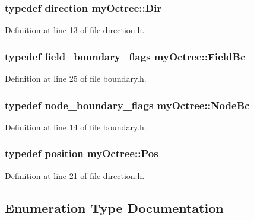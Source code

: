 \subsubsection[{Dir}]{\setlength{\rightskip}{0pt plus 5cm}typedef {\bf direction} {\bf my\+Octree\+::\+Dir}}\label{namespacemy_octree_a4895f593ecb4b9b86353c728c62fff97}


Definition at line 13 of file direction.\+h.

\hypertarget{namespacemy_octree_a7fe9f44df74345b4ab428b88ed3bba4e}{}
\subsubsection[{Field\+Bc}]{\setlength{\rightskip}{0pt plus 5cm}typedef {\bf field\+\_\+boundary\+\_\+flags} {\bf my\+Octree\+::\+Field\+Bc}}\label{namespacemy_octree_a7fe9f44df74345b4ab428b88ed3bba4e}


Definition at line 25 of file boundary.\+h.

\hypertarget{namespacemy_octree_aa311ec15135ad37690de8c062cfd8124}{}
\subsubsection[{Node\+Bc}]{\setlength{\rightskip}{0pt plus 5cm}typedef {\bf node\+\_\+boundary\+\_\+flags} {\bf my\+Octree\+::\+Node\+Bc}}\label{namespacemy_octree_aa311ec15135ad37690de8c062cfd8124}


Definition at line 14 of file boundary.\+h.

\hypertarget{namespacemy_octree_a959e38545673b2266bead87ede9c2e9b}{}
\subsubsection[{Pos}]{\setlength{\rightskip}{0pt plus 5cm}typedef {\bf position} {\bf my\+Octree\+::\+Pos}}\label{namespacemy_octree_a959e38545673b2266bead87ede9c2e9b}


Definition at line 21 of file direction.\+h.



\subsection{Enumeration Type Documentation}
\hypertarget{namespacemy_octree_a37e50dbbdf1f0cfd834254378771ade8}{}
